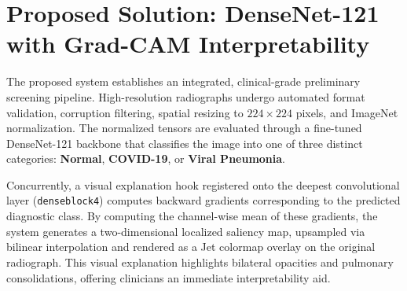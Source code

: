 \documentclass[12pt,a4paper]{report}
\begin{document}
\section{Proposed Solution: DenseNet-121 with Grad-CAM Interpretability}
The proposed system establishes an integrated, clinical-grade preliminary screening pipeline. High-resolution radiographs undergo automated format validation, corruption filtering, spatial resizing to $224 \times 224$ pixels, and ImageNet normalization. The normalized tensors are evaluated through a fine-tuned DenseNet-121 backbone that classifies the image into one of three distinct categories: \textbf{Normal}, \textbf{COVID-19}, or \textbf{Viral Pneumonia}.

Concurrently, a visual explanation hook registered onto the deepest convolutional layer (\texttt{denseblock4}) computes backward gradients corresponding to the predicted diagnostic class. By computing the channel-wise mean of these gradients, the system generates a two-dimensional localized saliency map, upsampled via bilinear interpolation and rendered as a Jet colormap overlay on the original radiograph. This visual explanation highlights bilateral opacities and pulmonary consolidations, offering clinicians an immediate interpretability aid.
\end{document}
